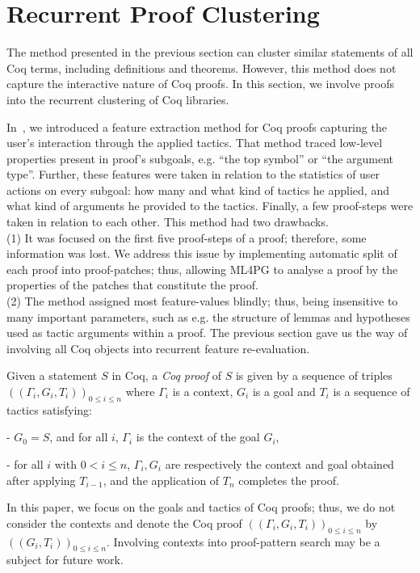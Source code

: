 \section{Recurrent Proof Clustering}\label{sec:recurrent}

The method presented in the previous section can cluster similar statements of all Coq terms, including definitions and theorems.
However, this method does not capture the interactive nature of Coq proofs.
In this section, we involve proofs into the recurrent clustering of Coq libraries.

 In~\cite{KHG13},
we introduced a feature extraction method for Coq proofs capturing
the user's interaction through the applied tactics. That method
traced
low-level properties present in proof's subgoals, e.g. ``the
top symbol'' or ``the argument type''. Further, these features were taken
in relation to the statistics of user actions on every subgoal: how many and what
kind of tactics he applied, and what kind of arguments he provided to the
tactics. Finally, a few proof-steps were taken in relation to each other.
This method  had two drawbacks.\\
(1) It was  focused on the first
five proof-steps of a proof; therefore, some information was lost. We address this issue by implementing automatic split of each proof into proof-patches; thus, allowing ML4PG to analyse a proof by the properties
of the patches that constitute the proof. \\
(2) The method assigned most feature-values blindly; thus, being insensitive to many important parameters, such as e.g. the structure of lemmas and hypotheses used as
tactic arguments within a proof.
The previous section gave us the way of involving all Coq objects into recurrent feature re-evaluation.

\begin{definition}
 Given a statement $S$ in Coq, a \emph{Coq proof} of $S$ is given by a sequence of triples $((\Gamma_i,G_i,T_i))_{0\leq i\leq n}$ where $\Gamma_i$ is a context,
 $G_i$ is a goal and $T_i$ is a sequence of tactics satisfying:

  - $G_0=S$, and for all $i$, $\Gamma_i$ is the context of the goal $G_i$,

  - for all $i$ with $0<i\leq n$, $\Gamma_i,G_i$ are respectively the context and goal obtained after applying $T_{i-1}$, and
    the application of $T_n$ completes the proof.
\end{definition}

In this paper, we focus on the goals and tactics of Coq proofs; thus, we do not consider the contexts and denote the
Coq proof $((\Gamma_i,G_i,T_i))_{0\leq i\leq n}$ by $((G_i,T_i))_{0\leq i\leq n}$. Involving contexts into proof-pattern search may be a subject for future work.


